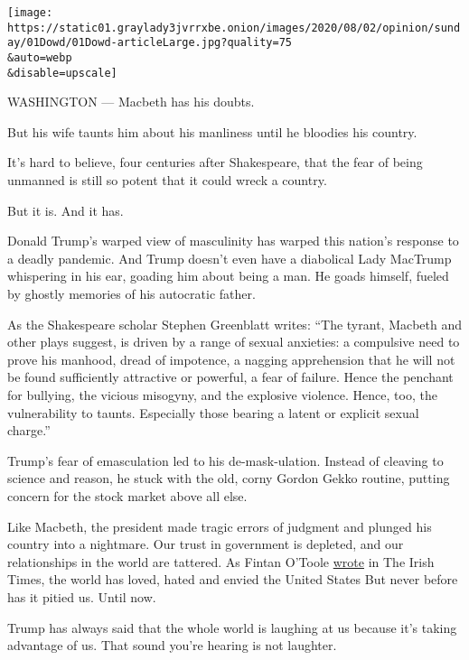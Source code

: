 \texttt{[image: https://static01.graylady3jvrrxbe.onion/images/2020/08/02/opinion/sunday/01Dowd/01Dowd-articleLarge.jpg?quality=75\\\&auto=webp\\\&disable=upscale]}

WASHINGTON --- Macbeth has his doubts.

But his wife taunts him about his manliness until he bloodies his
country.

It's hard to believe, four centuries after Shakespeare, that the fear of
being unmanned is still so potent that it could wreck a country.

But it is. And it has.

Donald Trump's warped view of masculinity has warped this nation's
response to a deadly pandemic. And Trump doesn't even have a diabolical
Lady MacTrump whispering in his ear, goading him about being a man. He
goads himself, fueled by ghostly memories of his autocratic father.

As the Shakespeare scholar Stephen Greenblatt writes: ``The tyrant,
Macbeth and other plays suggest, is driven by a range of sexual
anxieties: a compulsive need to prove his manhood, dread of impotence, a
nagging apprehension that he will not be found sufficiently attractive
or powerful, a fear of failure. Hence the penchant for bullying, the
vicious misogyny, and the explosive violence. Hence, too, the
vulnerability to taunts. Especially those bearing a latent or explicit
sexual charge.''

Trump's fear of emasculation led to his de-mask-ulation. Instead of
cleaving to science and reason, he stuck with the old, corny Gordon
Gekko routine, putting concern for the stock market above all else.

Like Macbeth, the president made tragic errors of judgment and plunged
his country into a nightmare. Our trust in government is depleted, and
our relationships in the world are tattered. As Fintan O'Toole
\href{https://www.irishtimes.com/opinion/fintan-o-toole-donald-trump-has-destroyed-the-country-he-promised-to-make-great-again-1.4235928?mode=sample\&auth-failed=1\&pw-origin=https\%3A\%2F\%2Fwww.irishtimes.com\%2Fopinion\%2Ffintan-o-toole-donald-trump-has-destroyed-the-country-he-promised-to-make-great-again-1.4235928}{wrote}
in The Irish Times, the world has loved, hated and envied the United
States But never before has it pitied us. Until now.

Trump has always said that the whole world is laughing at us because
it's taking advantage of us. That sound you're hearing is not laughter.

